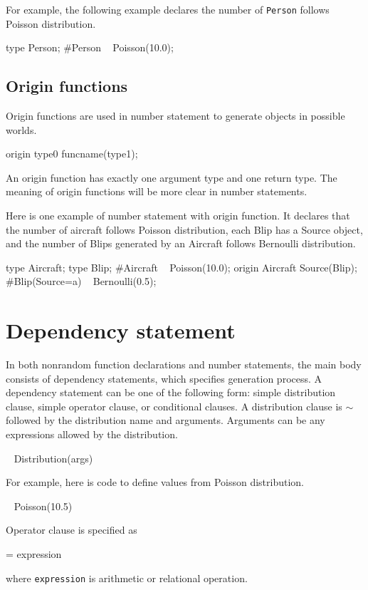 \documentclass[12pt]{article}
\begin{document}
For example, the following example declares the number of \texttt{Person} follows Poisson distribution. 
\begin{blogcode}
type Person;
#Person ~ Poisson(10.0);
\end{blogcode}

\subsection{Origin functions}
Origin functions are used in number statement to generate objects in possible worlds. 
\begin{blogcode}
origin type0 funcname(type1);
\end{blogcode}
An origin function has exactly one argument type and one return type. 
The meaning of origin functions will be more clear in number statements. 

Here is one  example of number statement with origin function. It declares that the number of aircraft follows Poisson distribution, each Blip has a Source object, and the number of Blips generated by an Aircraft follows Bernoulli distribution.
\begin{blogcode}
type Aircraft;
type Blip;
#Aircraft ~ Poisson(10.0); 
origin Aircraft Source(Blip);
#Blip(Source=a) ~ Bernoulli(0.5);
\end{blogcode}

\section{Dependency statement}
In both nonrandom function declarations and number statements, the main body consists of dependency statements, which specifies generation process. 
A dependency statement can be one of the following form: simple distribution clause, simple operator clause, or conditional clauses.
A distribution clause is $\sim$ followed by the distribution name and arguments. Arguments can be any expressions allowed by the distribution.  
\begin{blogcode}
~ Distribution(args)
\end{blogcode} 
For example, here is code to define values from Poisson distribution.
\begin{blogcode}
~ Poisson(10.5)
\end{blogcode}

Operator clause is specified as
\begin{blogcode}
= expression
\end{blogcode}
where \texttt{expression} is arithmetic or relational operation. 
\end{document}
